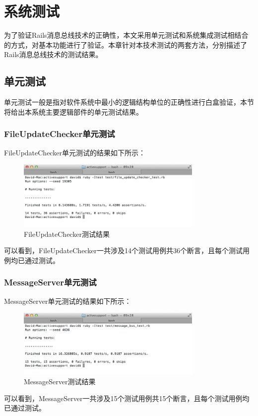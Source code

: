 \chapter{系统测试}
为了验证Rails消息总线技术的正确性，本文采用单元测试和系统集成测试相结合的方式，对基本功能进行了验证。本章针对本技术测试的两套方法，分别描述了Rails消息总线技术的测试结果。

\section{单元测试}
单元测试一般是指对软件系统中最小的逻辑结构单位的正确性进行白盒验证，本节将给出本系统主要逻辑部件的单元测试结果。

\subsection{FileUpdateChecker单元测试}
FileUpdateChecker单元测试的结果如下所示：

\begin{figure}[h]
\centering
\includegraphics[width=0.8\textwidth]{images/test/fuc.png}
\caption{FileUpdateChecker测试结果}
\end{figure}
可以看到，FileUpdateChecker一共涉及14个测试用例共36个断言，且每个测试用例均已通过测试。

\subsection{MessageServer单元测试}
MessageServer单元测试的结果如下所示：

\begin{figure}[h]
\centering
\includegraphics[width=0.8\textwidth]{images/test/msg.png}
\caption{MessageServer测试结果}
\end{figure}
可以看到，MessageServer一共涉及15个测试用例共15个断言，且每个测试用例均已通过测试。


